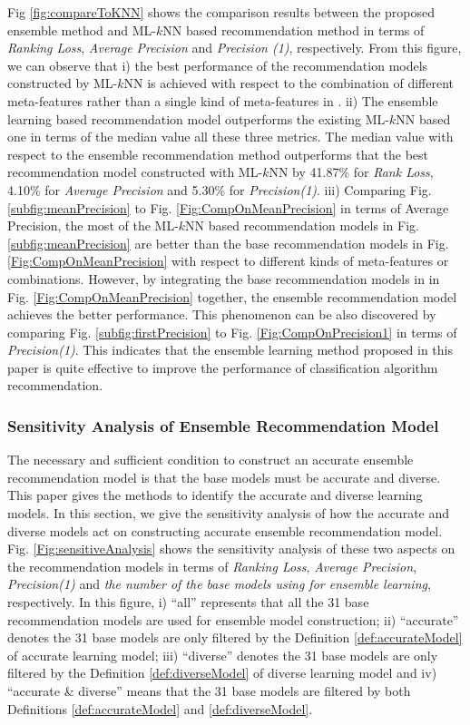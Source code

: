 \documentclass[acmsmall]{acmart}
\begin{document}
Fig \ref{fig:compareToKNN} shows the comparison results between the
proposed ensemble method and ML-$k$NN based recommendation method in
terms of \emph{Ranking Loss}, \emph{Average Precision} and
\emph{Precision (1)}, respectively. From this figure, we can observe
that i) the best performance of the recommendation models
constructed by ML-$k$NN is achieved with respect to the combination
of different meta-features rather than a single kind of
meta-features in \cite{wang2014generic}. ii) The ensemble learning
based recommendation model outperforms the existing ML-$k$NN based
one in terms of the median value all these three metrics. The median
value with respect to the ensemble recommendation method outperforms
that the best recommendation model constructed with ML-$k$NN by
41.87\% for \emph{Rank Loss}, 4.10\% for \emph{Average Precision}
and 5.30\% for \emph{Precision(1)}. iii) Comparing Fig.
\ref{subfig:meanPrecision} to Fig. \ref{Fig:CompOnMeanPrecision} in
terms of Average Precision, the most of the ML-$k$NN based
recommendation models in Fig. \ref{subfig:meanPrecision} are
better than the base recommendation models in Fig.
\ref{Fig:CompOnMeanPrecision} with respect to different kinds of
meta-features or combinations. However, by integrating the base
recommendation models in in Fig.
\ref{Fig:CompOnMeanPrecision} together, the ensemble recommendation model
achieves the better performance. This phenomenon can be also
discovered by comparing Fig. \ref{subfig:firstPrecision} to Fig.
\ref{Fig:CompOnPrecision1} in terms of \emph{Precision(1)}. This
indicates that the ensemble learning method proposed in this paper
is quite effective to improve the performance of classification
algorithm recommendation.


\subsubsection{Sensitivity Analysis of Ensemble Recommendation Model}

The necessary and sufficient condition to construct an accurate
ensemble recommendation model is that the base models must be
accurate and diverse. This paper gives the methods to identify the
accurate and diverse learning models. In this section, we give the
sensitivity analysis of how the accurate and diverse models act on
constructing accurate ensemble recommendation model. Fig.
\ref{Fig:sensitiveAnalysis} shows the sensitivity analysis of these
two aspects on the recommendation models in terms of \emph{Ranking
	Loss}, \emph{Average Precision}, \emph{Precision(1)} and \emph{the
	number of the base models using for ensemble learning},
respectively. In this figure, i) ``all'' represents that all the 31
base recommendation models are used for ensemble model construction;
ii) ``accurate'' denotes the 31 base models are only filtered by the
Definition \ref{def:accurateModel} of accurate learning model; iii)
``diverse'' denotes the 31 base models are only filtered by the
Definition \ref{def:diverseModel} of diverse learning model and iv)
``accurate \& diverse'' means that the 31 base models are filtered
by both Definitions \ref{def:accurateModel} and
\ref{def:diverseModel}.
\end{document}
